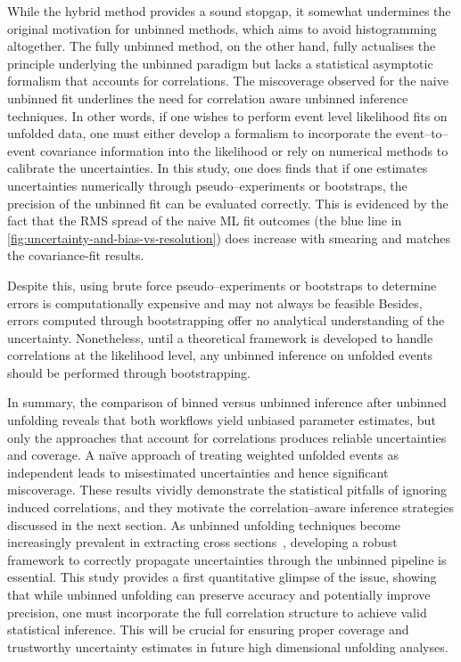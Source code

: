         While the hybrid method provides a sound stopgap, it somewhat undermines the original motivation for unbinned methods, which aims to avoid histogramming altogether.
        The fully unbinned method, on the other hand, fully actualises the principle underlying the unbinned paradigm but lacks a statistical asymptotic formalism that accounts for correlations.
        The miscoverage observed for the naive unbinned fit underlines the need for correlation aware unbinned inference techniques.
        In other words, if one wishes to perform event level likelihood fits on unfolded data, one must either develop a formalism to incorporate the event--to--event covariance information into the likelihood or rely on numerical methods to calibrate the uncertainties.
        In this study, one does finds that if one estimates uncertainties numerically through pseudo--experiments or bootstraps, the precision of the unbinned fit can be evaluated correctly.
        This is evidenced by the fact that the RMS spread of the naive ML fit outcomes (the blue line in \cref{fig:uncertainty-and-bias-vs-resolution}) does increase with smearing and matches the covariance-fit results.
        
        Despite this, using brute force pseudo--experiments or bootstraps to determine errors is computationally expensive and may not always be feasible
        Besides, errors computed through bootstrapping offer no analytical understanding of the uncertainty.
        Nonetheless, until a theoretical framework is developed to handle correlations at the likelihood level, any unbinned inference on unfolded events should be performed through bootstrapping.
    
        In summary, the comparison of binned versus unbinned inference after unbinned unfolding reveals that both workflows yield unbiased parameter estimates, but only the approaches that account for correlations produces reliable uncertainties and coverage.
        A na\"ive approach of treating weighted unfolded events as independent leads to misestimated uncertainties and hence significant miscoverage.
        These results vividly demonstrate the statistical pitfalls of ignoring induced correlations, and they motivate the correlation--aware inference strategies discussed in the next section.
        As unbinned unfolding techniques become increasingly prevalent in extracting cross sections~\cite{ATLAS:2024xxl,ATLAS:2025qtv, noauthor_observation_2024}, developing a robust framework to correctly propagate uncertainties through the unbinned pipeline is essential.
        This study provides a first quantitative glimpse of the issue, showing that while unbinned unfolding can preserve accuracy and potentially improve precision, one must incorporate the full correlation structure to achieve valid statistical inference.
        This will be crucial for ensuring proper coverage and trustworthy uncertainty estimates in future high dimensional unfolding analyses.

